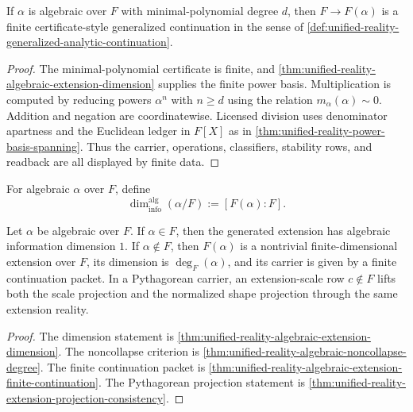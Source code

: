 \begin{theorem}
\label{thm:unified-reality-algebraic-extension-finite-continuation}
If $\alpha$ is algebraic over $F$ with minimal-polynomial degree $d$,
then $F\to F(\alpha)$ is a finite certificate-style generalized
continuation in the sense of
\autoref{def:unified-reality-generalized-analytic-continuation}.
\end{theorem}

\begin{proof}
The minimal-polynomial certificate is finite, and
\autoref{thm:unified-reality-algebraic-extension-dimension} supplies the
finite power basis. Multiplication is computed by reducing powers
$\alpha^n$ with $n\ge d$ using the relation
$m_\alpha(\alpha)\sim0$. Addition and negation are coordinatewise.
Licensed division uses denominator apartness and the Euclidean ledger in
$F[X]$ as in
\autoref{thm:unified-reality-power-basis-spanning}. Thus the carrier,
operations, classifiers, stability rows, and readback are all displayed
by finite data.
\end{proof}

\begin{definition}
\label{def:unified-reality-algebraic-information-dimension}
For algebraic $\alpha$ over $F$, define
$$
\dim_{\mathrm{info}}^{\mathrm{alg}}(\alpha/F)
:=
[F(\alpha):F].
$$
\end{definition}

\begin{theorem}
\label{thm:unified-reality-algebraic-extension-direction-principle}
Let $\alpha$ be algebraic over $F$. If $\alpha\in F$, then the
generated extension has algebraic information dimension $1$. If
$\alpha\notin F$, then $F(\alpha)$ is a nontrivial finite-dimensional
extension over $F$, its dimension is $\deg_F(\alpha)$, and its carrier is
given by a finite continuation packet. In a Pythagorean carrier, an
extension-scale row $c\notin F$ lifts both the scale projection and the
normalized shape projection through the same extension reality.
\end{theorem}

\begin{proof}
The dimension statement is
\autoref{thm:unified-reality-algebraic-extension-dimension}. The
noncollapse criterion is
\autoref{thm:unified-reality-algebraic-noncollapse-degree}. The finite
continuation packet is
\autoref{thm:unified-reality-algebraic-extension-finite-continuation}.
The Pythagorean projection statement is
\autoref{thm:unified-reality-extension-projection-consistency}.
\end{proof}
